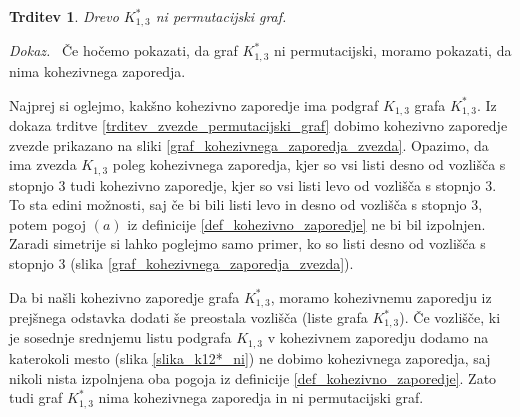 \documentclass[a4paper, 12pt]{book}
\newtheorem{trditev}{Trditev}[chapter]
\newenvironment{dokaz}{\emph{Dokaz.}\ }{\hspace{\fill}{$\Box$}}
\begin{document}
\begin{trditev}
\label{trditev_k13*_ni_permutacijski_graf}
    Drevo $K_{1,3}^*$ ni permutacijski graf.
\end{trditev}
\begin{dokaz}
    Če hočemo pokazati, da graf $K_{1,3}^*$ ni permutacijski, moramo pokazati, da nima kohezivnega zaporedja. 
    
    Najprej si oglejmo, kakšno kohezivno zaporedje ima podgraf $K_{1, 3}$ grafa $K_{1, 3}^*$. Iz dokaza trditve \ref{trditev_zvezde_permutacijski_graf} dobimo kohezivno zaporedje zvezde prikazano na sliki \ref{graf_kohezivnega_zaporedja_zvezda}. Opazimo, da ima zvezda $K_{1, 3}$ poleg kohezivnega zaporedja, kjer so vsi listi desno od vozlišča s stopnjo $3$ tudi kohezivno zaporedje, kjer so vsi listi levo od vozlišča s stopnjo $3$. To sta edini možnosti, saj če bi bili listi levo in desno od vozlišča s stopnjo $3$, potem pogoj $(a)$ iz definicije \ref{def_kohezivno_zaporedje} ne bi bil izpolnjen. Zaradi simetrije si lahko poglejmo samo primer, ko so listi desno od vozlišča s stopnjo $3$ (slika \ref{graf_kohezivnega_zaporedja_zvezda}). 
    
    Da bi našli kohezivno zaporedje grafa $K_{1,3}^*$, moramo kohezivnemu zaporedju iz prejšnega odstavka dodati še preostala vozlišča (liste grafa $K_{1,3}^*$). Če vozlišče, ki je sosednje srednjemu listu podgrafa $K_{1,3}$ v kohezivnem zaporedju dodamo na katerokoli mesto (slika \ref{slika_k12*_ni}) ne dobimo kohezivnega zaporedja, saj nikoli nista izpolnjena oba pogoja iz definicije \ref{def_kohezivno_zaporedje}. Zato tudi graf $K_{1,3}^*$ nima kohezivnega zaporedja in ni permutacijski graf.
\end{dokaz}
\end{document}
